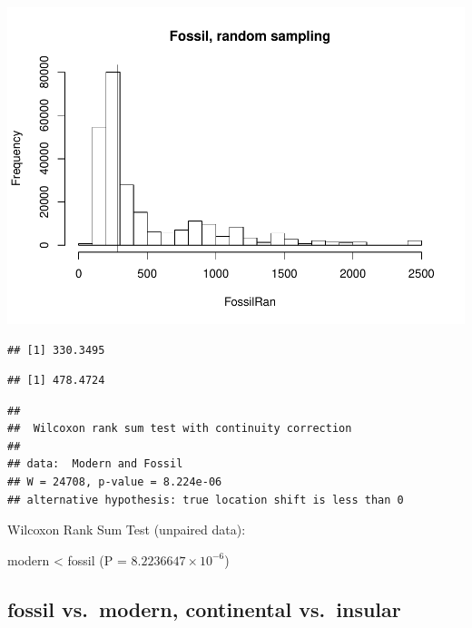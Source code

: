 \documentclass[]{article}
\begin{document}
\includegraphics{MA_JJ_files/figure-latex/randon sampling modern fossil-1.pdf}

\begin{verbatim}
## [1] 330.3495
\end{verbatim}

\begin{verbatim}
## [1] 478.4724
\end{verbatim}

\begin{verbatim}
## 
##  Wilcoxon rank sum test with continuity correction
## 
## data:  Modern and Fossil
## W = 24708, p-value = 8.224e-06
## alternative hypothesis: true location shift is less than 0
\end{verbatim}

Wilcoxon Rank Sum Test (unpaired data):

modern \textless{} fossil (P = \(8.2236647\times 10^{-6}\))

\newpage

\subsection{fossil vs.~modern, continental
vs.~insular}\label{fossil-vs.modern-continental-vs.insular}
\end{document}
